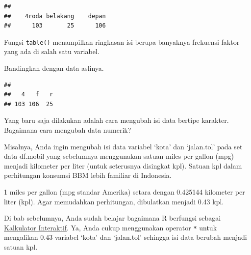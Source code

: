 \documentclass[openany]{book}
\newenvironment{Shaded}{\begin{snugshade}}{\end{snugshade}}
\newcommand{\KeywordTok}[1]{\textcolor[rgb]{0.13,0.29,0.53}{\textbf{#1}}}
\newcommand{\FloatTok}[1]{\textcolor[rgb]{0.00,0.00,0.81}{#1}}
\newcommand{\StringTok}[1]{\textcolor[rgb]{0.31,0.60,0.02}{#1}}
\newcommand{\CommentTok}[1]{\textcolor[rgb]{0.56,0.35,0.01}{\textit{#1}}}
\newcommand{\OperatorTok}[1]{\textcolor[rgb]{0.81,0.36,0.00}{\textbf{#1}}}
\newcommand{\NormalTok}[1]{#1}
\begin{document}
\begin{verbatim}
## 
##    4roda belakang    depan 
##      103       25      106
\end{verbatim}

Fungsi \texttt{table()} menampilkan ringkasan isi berupa banyaknya
frekuensi faktor yang ada di salah satu variabel.

Bandingkan dengan data aslinya.

\begin{Shaded}
\end{Shaded}

\begin{verbatim}
## 
##   4   f   r 
## 103 106  25
\end{verbatim}

Yang baru saja dilakukan adalah cara mengubah isi data bertipe karakter.
Bagaimana cara mengubah data numerik?

Misalnya, Anda ingin mengubah isi data variabel `kota' dan `jalan.tol'
pada set data df.mobil yang sebelumnya menggunakan satuan miles per
gallon (mpg) menjadi kilometer per liter (untuk seterusnya disingkat
kpl). Satuan kpl dalam perhitungan konsumsi BBM lebih familiar di
Indonesia.

1 miles per gallon (mpg standar Amerika) setara dengan 0.425144
kilometer per liter (kpl). Agar memudahkan perhitungan, dibulatkan
menjadi 0.43 kpl.

Di bab sebelumnya, Anda sudah belajar bagaimana R berfungsi sebagai
\protect\hyperlink{kalkulator-interaktif}{Kalkulator Interaktif}. Ya,
Anda cukup menggunakan operator \texttt{*} untuk mengalikan 0.43
variabel `kota' dan `jalan.tol' sehingga isi data berubah menjadi satuan
kpl.

\begin{Shaded}
\end{Shaded}
\end{document}
